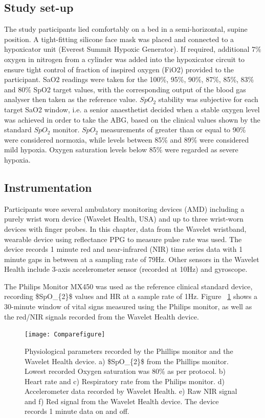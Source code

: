 \subsection{Study set-up}

The study participants lied comfortably on a bed  in a semi-horizontal, supine position. A tight-fitting silicone face mask was placed and connected to a hypoxicator unit (Everest Summit Hypoxic Generator). If required, additional 7\% oxygen in nitrogen from a cylinder was added into the hypoxicator circuit to ensure tight control of fraction of inspired oxygen (FiO2) provided to the participant. SaO2 readings were taken for the 100\%, 95\%, 90\%, 87\%, 85\%, 83\% and 80\% SpO2 target values, with the corresponding output of the blood gas analyser then taken as the reference value. 
$SpO_{2}$ stability was subjective for each target SaO2 window, i.e. a senior
anaesthetist decided when a stable oxygen level was achieved in order to take the ABG, based on the clinical values shown by the standard $SpO_{2}$ monitor. $SpO_{2}$ measurements of greater than or equal to 90\% were considered normoxia, while levels between 85\% and 89\% were considered mild hypoxia. Oxygen saturation levels below 85\% were regarded as severe hypoxia.

\subsection{Instrumentation}

Participants wore several ambulatory monitoring devices (AMD) including a purely wrist worn device (Wavelet Health, USA) and up to three wrist-worn devices with finger probes. In this chapter, data from the Wavelet wristband, wearable device using reflectance PPG to measure pulse rate was used. The device records 1 minute red and near-infrared (NIR) time series data with 1 minute gaps in between at a sampling rate of 79Hz. Other sensors in the Wavelet Health include 3-axis accelerometer sensor (recorded at 10Hz) and gyroscope.

The Philips Monitor MX450 was used as the reference clinical standard device, recording \gls{$SpO_{2}$} values and HR at a sample rate of 1Hz. Figure ~\ref{physio} shows a 30-minute window of vital signs measured using the Philips monitor, as well as the red/NIR signals recorded from the Wavelet Health device. 

\begin{figure}
	\centering
	 \texttt{[image: Comparefigure]}
	    \caption[Reference physiological parameters recorded by the Phillips monitor and the Wavelet Health device.]
	    {
	    Physiological parameters recorded by the Phillips monitor and the Wavelet Health device. 
	    a) \gls{$SpO_{2}$} from the Phillips monitor. Lowest recorded Oxygen saturation was 80\% as per protocol. b) Heart rate and c) Respiratory rate from the Philips monitor. d) Accelerometer data recorded by Wavelet Health. e) Raw NIR signal and f) Red signal from the Wavelet Health device. The device records 1 minute data on and off.\\
	    }      
	 \label{physio}  
\end{figure}

